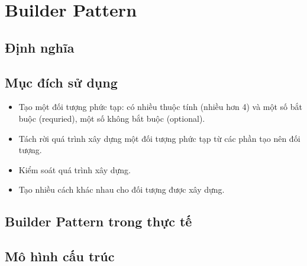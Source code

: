 \chapter{Builder Pattern}

\section{Định nghĩa}

\section{Mục đích sử dụng}
\begin{itemize}
\item Tạo một đối tượng phức tạp: có nhiều thuộc tính (nhiều hơn 4) và một số bắt buộc (requried), một số không bắt buộc (optional).
\item Tách rời quá trình xây dựng một đối tượng phức tạp từ các phần tạo nên đối tượng.
\item Kiểm soát quá trình xây dựng.
\item Tạo nhiều cách khác nhau cho đối tượng được xây dựng.
\end{itemize}

\section{Builder Pattern trong thực tế}

\section{Mô hình cấu trúc}
